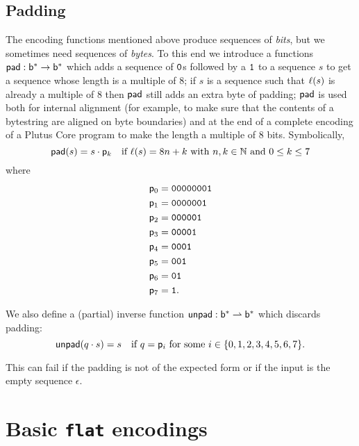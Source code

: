 \subsection{Padding}
The encoding functions mentioned above produce sequences of \textit{bits}, but
we sometimes need sequences of \textit{bytes}.  To this end we introduce a
functions $\mathsf{pad}: \mathsf{b}^* \rightarrow \mathsf{b}^*$ which adds a sequence of $\mathtt{0}$s
followed by a $\mathtt{1}$ to a sequence $s$ to get a sequence whose length is a
multiple of 8; if $s$ is a sequence such that $\operatorname{\ell}(s)$ is already a multiple of 8
then $\mathsf{pad}$ still adds an extra byte of padding; $\mathsf{pad}$ is used both for
internal alignment (for example, to make sure that the contents of a bytestring
are aligned on byte boundaries) and at the end of a complete encoding of a
Plutus Core program to make the length a multiple of 8 bits.
Symbolically,
$$
\mathsf{pad}(s)  = s \cdot \mathsf{p}_{k} \quad \text{if $\operatorname{\ell}(s) = 8n+k$ with $n,k \in \mathbb{N}$ and $0 \leq k \leq 7$}
$$
where
\begin{align*}
 \mathsf{p}_{0} &= \mathtt{00000001} \\
 \mathsf{p}_{1} &= \mathtt{0000001}  \\
 \mathsf{p}_{2} &= \mathtt{000001}   \\
 \mathsf{p}_{3} &= \mathtt{00001}    \\
 \mathsf{p}_{4} &= \mathtt{0001}     \\
 \mathsf{p}_{5} &= \mathtt{001}      \\
 \mathsf{p}_{6} &= \mathtt{01}       \\
 \mathsf{p}_{7} &= \mathtt{1}.
 \end{align*}

\noindent We also define a (partial) inverse function $\mathsf{unpad}: \mathsf{b}^* \rightharpoonup
\mathsf{b}^*$ which discards padding:
$$
  \mathsf{unpad}(q \cdot s) = s \quad \text{if $q = \mathsf{p}_{i}$ for some $i \in \{0,1,2,3,4,5,6,7\} $}.
$$

\noindent This can fail if the padding is not of the expected form or if the input is
the empty sequence $\epsilon$.

\section{Basic \texttt{flat} encodings}
\label{sec:basic-flat-encodings}

